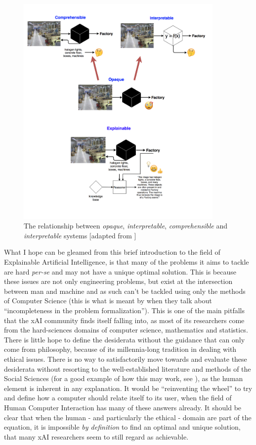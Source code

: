 \begin{figure}[htbp]
\centerline{\includegraphics[width=0.9\textwidth]{introduction/images/xai-systems-taxonomy}}
\caption{The relationship between \textit{opaque}, \textit{interpretable},  \textit{comprehensible} and \textit{interpretable} systems [adapted from \citet{Doran2018}]}
\label{fig:xai-systems-taxonomy}
\end{figure}

What I hope can be gleamed from this brief introduction to the field of Explainable Artificial Intelligence, is that many of the problems it aims to tackle are hard \textit{per-se} and may not have a unique optimal solution.  
This is because these issues are not only engineering problems, but exist at the intersection between man and machine and as such can't be tackled using only the methods of Computer Science (this is what is meant by \citet{doshi2017towards} when they talk about \enquote{incompleteness in the problem formalization}).  
This is one of the main pitfalls that the xAI community finds itself falling into, as most of its researchers come from the hard-sciences domains of computer science, mathematics and statistics. 
There is little hope to define the desiderata without the guidance that can only come from philosophy, because of its millennia-long tradition in dealing with ethical issues.  
There is no way to satisfactorily move towards and evaluate these desiderata without resorting to the well-established literature and methods of the Social Sciences (for a good example of how this may work, see \citet{stumpf2009interacting}), as the human element is inherent in any explanation. 
It would be \enquote{reinventing the wheel} to try and define how a computer should relate itself to its user, when the field of Human Computer Interaction has many of these answers already. 
It should be clear that when the human - and particularly the ethical - domain are part of the equation, it is impossible \textit{by definition} to find an optimal and unique solution, that many xAI researchers seem to still regard as achievable.

